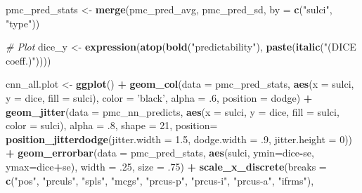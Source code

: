 \documentclass[
]{article}
\newenvironment{Shaded}{\begin{snugshade}}{\end{snugshade}}
\newcommand{\CommentTok}[1]{\textcolor[rgb]{0.56,0.35,0.01}{\textit{#1}}}
\newcommand{\DataTypeTok}[1]{\textcolor[rgb]{0.13,0.29,0.53}{#1}}
\newcommand{\DecValTok}[1]{\textcolor[rgb]{0.00,0.00,0.81}{#1}}
\newcommand{\FloatTok}[1]{\textcolor[rgb]{0.00,0.00,0.81}{#1}}
\newcommand{\KeywordTok}[1]{\textcolor[rgb]{0.13,0.29,0.53}{\textbf{#1}}}
\newcommand{\NormalTok}[1]{#1}
\newcommand{\OperatorTok}[1]{\textcolor[rgb]{0.81,0.36,0.00}{\textbf{#1}}}
\newcommand{\StringTok}[1]{\textcolor[rgb]{0.31,0.60,0.02}{#1}}
\begin{document}
\begin{Shaded}
\begin{Highlighting}[]
\NormalTok{pmc_pred_stats <-}\StringTok{ }\KeywordTok{merge}\NormalTok{(pmc_pred_avg, pmc_pred_sd, }\DataTypeTok{by =} \KeywordTok{c}\NormalTok{(}\StringTok{"sulci"}\NormalTok{, }\StringTok{"type"}\NormalTok{))}

\CommentTok{# Plot}
\NormalTok{dice_y <-}\StringTok{ }\KeywordTok{expression}\NormalTok{(}\KeywordTok{atop}\NormalTok{(}\KeywordTok{bold}\NormalTok{(}\StringTok{"predictability"}\NormalTok{), }\KeywordTok{paste}\NormalTok{(}\KeywordTok{italic}\NormalTok{(}\StringTok{"(DICE coeff.)"}\NormalTok{))))}

\NormalTok{cnn_all.plot <-}\StringTok{ }\KeywordTok{ggplot}\NormalTok{() }\OperatorTok{+}
\StringTok{  }\KeywordTok{geom_col}\NormalTok{(}\DataTypeTok{data =}\NormalTok{ pmc_pred_stats, }\KeywordTok{aes}\NormalTok{(}\DataTypeTok{x =}\NormalTok{ sulci, }\DataTypeTok{y =}\NormalTok{ dice, }\DataTypeTok{fill =}\NormalTok{ sulci), }\DataTypeTok{color =} \StringTok{'black'}\NormalTok{,}
              \DataTypeTok{alpha =} \FloatTok{.6}\NormalTok{, }\DataTypeTok{position =}\NormalTok{ dodge) }\OperatorTok{+}
\StringTok{  }\KeywordTok{geom_jitter}\NormalTok{(}\DataTypeTok{data =}\NormalTok{ pmc_nn_predicts, }
              \KeywordTok{aes}\NormalTok{(}\DataTypeTok{x =}\NormalTok{ sulci, }\DataTypeTok{y =}\NormalTok{ dice, }\DataTypeTok{fill =}\NormalTok{ sulci, }\DataTypeTok{color =}\NormalTok{ sulci), }
              \DataTypeTok{alpha =} \FloatTok{.8}\NormalTok{, }\DataTypeTok{shape =} \DecValTok{21}\NormalTok{,}
              \DataTypeTok{position=}
                \KeywordTok{position_jitterdodge}\NormalTok{(}\DataTypeTok{jitter.width =} \FloatTok{1.5}\NormalTok{, }\DataTypeTok{dodge.width =} \FloatTok{.9}\NormalTok{, }\DataTypeTok{jitter.height =} \DecValTok{0}\NormalTok{)) }\OperatorTok{+}
\StringTok{  }\KeywordTok{geom_errorbar}\NormalTok{(}\DataTypeTok{data =}\NormalTok{ pmc_pred_stats, }\KeywordTok{aes}\NormalTok{(sulci, }\DataTypeTok{ymin=}\NormalTok{dice}\OperatorTok{-}\NormalTok{se, }\DataTypeTok{ymax=}\NormalTok{dice}\OperatorTok{+}\NormalTok{se),}
              \DataTypeTok{width =} \FloatTok{.25}\NormalTok{, }\DataTypeTok{size =} \FloatTok{.75}\NormalTok{) }\OperatorTok{+}
\StringTok{  }\KeywordTok{scale_x_discrete}\NormalTok{(}\DataTypeTok{breaks =} \KeywordTok{c}\NormalTok{(}\StringTok{"pos"}\NormalTok{, }\StringTok{"prculs"}\NormalTok{, }\StringTok{"spls"}\NormalTok{, }\StringTok{"mcgs"}\NormalTok{, }\StringTok{"prcus-p"}\NormalTok{, }\StringTok{"prcus-i"}\NormalTok{, }\StringTok{"prcus-a"}\NormalTok{, }\StringTok{"ifrms"}\NormalTok{), }

\end{Highlighting}
\end{Shaded}
\end{document}
